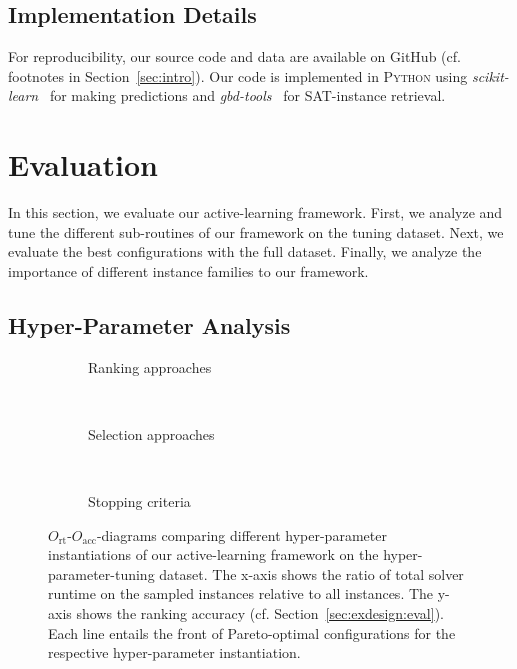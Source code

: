 \documentclass[runningheads]{llncs}
\begin{document}
\subsection{Implementation Details}

For reproducibility, our source code and data are available on GitHub (cf. footnotes in Section~\ref{sec:intro}).
Our code is implemented in \textsc{Python} using \emph{scikit-learn}~\cite{scikit-learn} for making predictions and \emph{gbd-tools}~\cite{IserS18} for SAT-instance retrieval.


\section{Evaluation}
\label{sec:eval}

In this section, we evaluate our active-learning framework.
First, we analyze and tune the different sub-routines of our framework on the tuning dataset.
Next, we evaluate the best configurations with the full dataset.
Finally, we analyze the importance of different instance families to our framework.

\subsection{Hyper-Parameter Analysis}

\begin{figure}[tbp!]
  \centering
  \begin{subfigure}{1.0\textwidth}
    \caption{Ranking approaches}
    \label{fig:annitraincolorranking}
  \end{subfigure}
  \\
  \vspace{0.2cm}
  \begin{subfigure}{1.0\textwidth}
    \caption{Selection approaches}
    \label{fig:annitraincolorselection}
  \end{subfigure}
  \\
  \vspace{0.2cm}
  \begin{subfigure}{1.0\textwidth}
    \caption{Stopping criteria}
    \label{fig:annitraincolorstopping}
  \end{subfigure}
  \caption{
    $O_{\operatorname{rt}}$-$O_{\operatorname{acc}}$-diagrams comparing different hyper-parameter instantiations of our active-learning framework on the hyper-parameter-tuning dataset.
    The x-axis shows the ratio of total solver runtime on the sampled instances relative to all instances.
    The y-axis shows the ranking accuracy (cf. Section~\ref{sec:exdesign:eval}).
    Each line entails the front of Pareto-optimal configurations for the respective hyper-parameter instantiation.
  }
  \label{fig:e2eallsolvers}
\end{figure}
\end{document}
